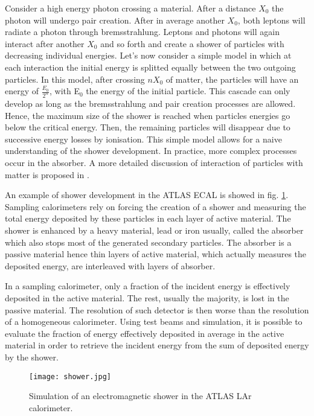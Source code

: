 Consider a high energy photon crossing a material.
After a distance $X_0$ the photon will undergo pair creation.
After in average another $X_0$, both leptons will radiate a photon through bremsstrahlung.
Leptons and photons will again interact after another $X_0$ and so forth and create a shower of particles with decreasing individual energies.
Let's now consider a simple model in which at each interaction the initial energy is splitted equally between the two outgoing particles.
In this model, after crossing \(nX_0\) of matter, the particles will have an energy of \(\frac{E_0}{2^n}\), with E\(_{\text{0}}\) the energy of the initial particle.
This cascade can only develop as long as the bremsstrahlung and pair creation processes are allowed.
Hence, the maximum size of the shower is reached when particles energies go below the critical energy.
Then, the remaining particles will disappear due to successive energy losses by ionisation.
This simple model allows for a naive understanding of the shower development.
In practice, more complex processes occur in the absorber.
A more detailed discussion of interaction of particles with matter is proposed in \cite{PDG2016}.

An example of shower development in the ATLAS ECAL is showed in fig. \ref{fig:org2e447b3}.
Sampling calorimeters rely on forcing the creation of a shower and measuring the total energy deposited by these particles in each layer of active material.
The shower is enhanced by a heavy material, lead or iron usually, called the absorber which also stops most of the generated secondary particles.
The absorber is a passive material hence thin layers  of active material, which actually measures the deposited energy, are interleaved with layers of absorber.

In a sampling calorimeter, only a fraction of the incident energy is effectively deposited in the active material.
The rest, usually the majority, is lost in the passive material.
The resolution of such detector is then worse than the resolution of a homogeneous calorimeter.
Using test beams and simulation, it is possible to evaluate the fraction of energy effectively deposited in average in the active material in order to retrieve the incident energy from the sum of deposited energy by the shower.

\begin{figure}[htbp]
\centering
\texttt{[image: shower.jpg]}
\caption{\label{fig:org2e447b3}
Simulation of an electromagnetic shower in the ATLAS LAr calorimeter.}
\end{figure}


